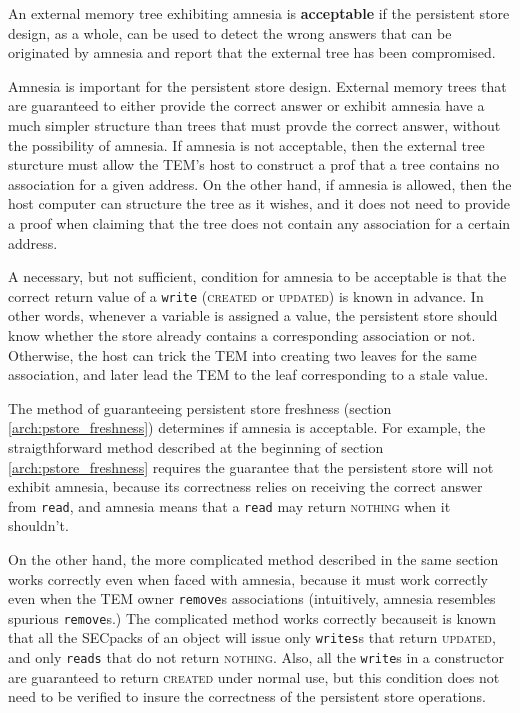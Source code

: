 An external memory tree exhibiting amnesia is \textbf{acceptable} if the
persistent store design, as a whole, can be used to detect the wrong answers
that can be originated by amnesia and report that the external tree has been
compromised.

Amnesia is important for the persistent store design. External
memory trees that are guaranteed to either provide the correct answer or
exhibit amnesia have a much simpler structure than trees that must provde the
correct answer, without the possibility of amnesia. If amnesia is not
acceptable, then the external tree sturcture must allow the TEM's host to
construct a prof that a tree contains no association for a given address. On
the other hand, if amnesia is allowed, then the host computer can structure the
tree as it wishes, and it does not need to provide a proof when claiming that
the tree does not contain any association for a certain address.

A necessary, but not sufficient, condition for amnesia to be acceptable is that
the correct return value of a \texttt{write} (\textsc{created} or
\textsc{updated}) is known in advance. In other words, whenever a variable is
assigned a value, the persistent store should know whether the store already
contains a corresponding association or not. Otherwise, the host can trick the
TEM into creating two leaves for the same association, and later lead the TEM
to the leaf corresponding to a stale value.

The method of guaranteeing persistent store freshness (section
\ref{arch:pstore_freshness}) determines if amnesia is acceptable. For example,
the straigthforward method described at the beginning of section
\ref{arch:pstore_freshness} requires the guarantee that the persistent store
will not exhibit amnesia, because its correctness relies on receiving the
correct answer from \texttt{read}, and amnesia means that a \texttt{read} may
return \textsc{nothing} when it shouldn't.

On the other hand, the more complicated method described in the same section
works correctly even when faced with amnesia, because it must work correctly
even when the TEM owner \texttt{remove}s associations (intuitively, amnesia
resembles spurious \texttt{remove}s.) The complicated method works correctly
becauseit is known that all the SECpacks of an object will issue only
\texttt{writes}s that return \textsc{updated}, and only \texttt{reads} that do
not return \textsc{nothing}. Also, all the \texttt{write}s in a constructor
are guaranteed to return \textsc{created} under normal use, but this condition
does not need to be verified to insure the correctness of the persistent store
operations.

